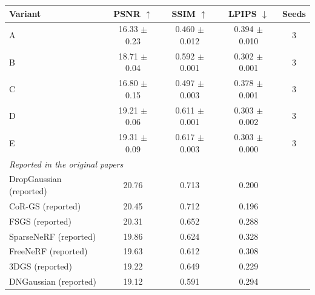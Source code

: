 \begin{tabular}{lcccc}
\toprule
Variant & PSNR $\uparrow$ & SSIM $\uparrow$ & LPIPS $\downarrow$ & Seeds \\
\midrule
A & 16.33 $\pm$ 0.23 & 0.460 $\pm$ 0.012 & 0.394 $\pm$ 0.010 & 3 \\
B & 18.71 $\pm$ 0.04 & 0.592 $\pm$ 0.001 & 0.302 $\pm$ 0.001 & 3 \\
C & 16.80 $\pm$ 0.15 & 0.497 $\pm$ 0.003 & 0.378 $\pm$ 0.001 & 3 \\
D & 19.21 $\pm$ 0.06 & 0.611 $\pm$ 0.001 & 0.303 $\pm$ 0.002 & 3 \\
E & 19.31 $\pm$ 0.09 & 0.617 $\pm$ 0.003 & 0.303 $\pm$ 0.000 & 3 \\
\midrule
\multicolumn{5}{l}{\textit{Reported in the original papers}} \\
DropGaussian (reported) & 20.76 & 0.713 & 0.200 &  \\
CoR-GS (reported) & 20.45 & 0.712 & 0.196 &  \\
FSGS (reported) & 20.31 & 0.652 & 0.288 &  \\
SparseNeRF (reported) & 19.86 & 0.624 & 0.328 &  \\
FreeNeRF (reported) & 19.63 & 0.612 & 0.308 &  \\
3DGS (reported) & 19.22 & 0.649 & 0.229 &  \\
DNGaussian (reported) & 19.12 & 0.591 & 0.294 &  \\
\bottomrule
\end{tabular}
